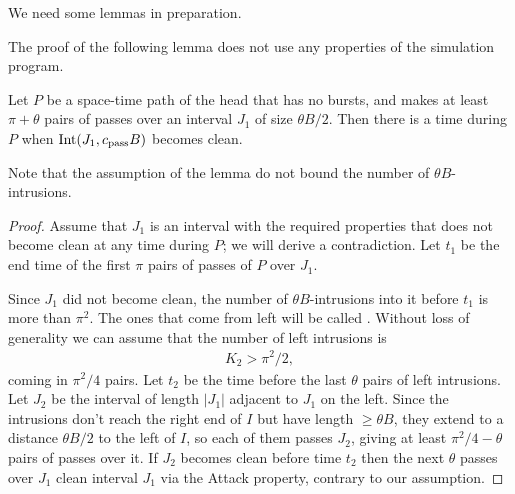 \documentclass[11pt]{memoir}
\theoremstyle{definition} %
\renewcommand{\ge}{\geq}
\def\B{B}
\newcommand{\Int}{\mathrm{Int}}
\newcommand{\passno}{\pi}
\newcommand{\cns}[1]{c_{\textrm{\upshape #1}}}
\newcommand{\CPass}{\cns{pass}}
\begin{document}
We need some lemmas in preparation.

The proof of the following lemma does not use any properties of the simulation program.

\begin{lemma}\label{lem:pass-clean-0}
  Let \( P \) be a space-time path of the head that has no bursts, and makes
  at least \( \passno+\theta \) pairs of passes over an interval \( J_{1} \) of size \( \theta\B/2 \).
  Then there is a time during \( P \) when \( \Int(J_{1},\CPass\B) \) becomes clean.
\end{lemma}
Note that the assumption of the lemma do not bound the number of \( \theta\B \)-intrusions.
\begin{proof}  
  Assume that \( J_{1} \) is an interval with the required properties that does not become clean
  at any time during  \( P \); we will derive a contradiction.
  Let \( t_{1} \) be the end time of the first \( \passno \) pairs of passes of \( P \) over \( J_{1} \).

Since \( J_{1} \) did not become clean, the number of \( \theta\B \)-intrusions into it before \( t_{1} \)
is more than \( \passno^{2} \).
The ones that come from left will be called .
Without loss of generality we can assume that the number of left intrusions is 
\begin{align*}
 K_{2}>\passno^{2}/2,
\end{align*}
coming in \( \passno^{2}/4 \) pairs.
Let \( t_{2} \) be the time before the last \( \theta \) pairs of left intrusions.
Let \( J_{2} \) be the interval of length \( |J_{1}| \) adjacent to \( J_{1} \) on the left.
Since the intrusions
don't reach the right end of \( I \) but have length \( \ge\theta\B \),
they extend to a distance \( \theta\B/2 \) to the left
of \( I \), so each of them passes \( J_{2} \), giving at least \( \passno^{2}/4-\theta \) pairs
of passes over it.
If \( J_{2} \) becomes clean before time \( t_{2} \) then the next \( \theta \) passes over \( J_{1} \)
clean interval \( J_{1} \) via the Attack property, contrary to our assumption.


\end{proof}
\end{document}
